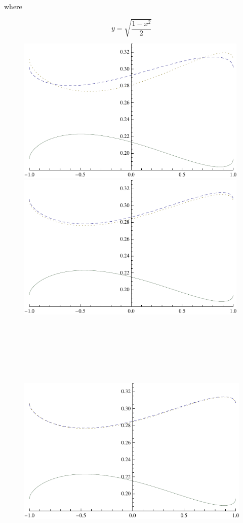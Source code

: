 \documentclass[a0,portrait]{a0poster}
\begin{document}
\begin{center}
{where

\begin{equation}
y=\sqrt{\frac{1-x^2}{2}}
\end{equation}

\begin{figure}
\includegraphics[height=70mm]{xyy-100-steps-1-1.pdf}
\includegraphics[height=70mm]{xyy-500-steps-1-1.pdf}
\includegraphics[height=140mm]{xyy-2000-steps-1-1.pdf}

\end{figure}}
\end{center}
\end{document}
